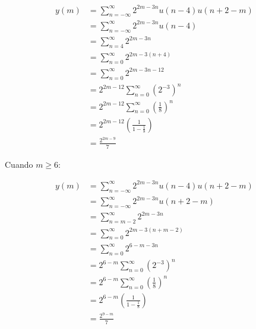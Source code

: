\documentclass[a4paper,12pt,final]{article}
\begin{document}
\begin{enumerate}[label=\alph*)]
          \begin{equation*}
            \begin{split}
              y\left(m\right) & = \sum_{n=-\infty}^{\infty} 2^{2m-3n} u\left(n-4\right) u\left(n+2-m\right) \\
                              & = \sum_{n=-\infty}^{\infty} 2^{2m-3n} u\left(n-4\right) \\
                              & = \sum_{n=4}^{\infty} 2^{2m-3n} \\
                              & = \sum_{n=0}^{\infty} 2^{2m-3\left(n+4\right)} \\
                              & = \sum_{n=0}^{\infty} 2^{2m-3n-12} \\
                              & = 2^{2m-12} \sum_{n=0}^{\infty} \left(2^{-3}\right)^{n} \\
                              & = 2^{2m-12} \sum_{n=0}^{\infty} \left(\frac{1}{8}\right)^{n} \\
                              & = 2^{2m-12} \left(\frac{1}{1-\frac{1}{8}}\right) \\
                              & = \frac{2^{2m-9}}{7}
            \end{split}
          \end{equation*}
          \vfill
          \newpage

          \noindent Cuando $m \geq 6$:

          \begin{equation*}
            \begin{split}
              y\left(m\right) & = \sum_{n=-\infty}^{\infty} 2^{2m-3n} u\left(n-4\right) u\left(n+2-m\right) \\
                              & = \sum_{n=-\infty}^{\infty} 2^{2m-3n} u\left(n+2-m\right) \\
                              & = \sum_{n=m-2}^{\infty} 2^{2m-3n} \\
                              & = \sum_{n=0}^{\infty} 2^{2m-3\left(n+m-2\right)} \\
                              & = \sum_{n=0}^{\infty} 2^{6-m-3n} \\
                              & = 2^{6-m} \sum_{n=0}^{\infty} \left(2^{-3}\right)^{n} \\
                              & = 2^{6-m} \sum_{n=0}^{\infty} \left(\frac{1}{8}\right)^{n} \\
                              & = 2^{6-m} \left(\frac{1}{1-\frac{1}{8}}\right) \\
                              & = \frac{2^{9-m}}{7}
            \end{split}
          \end{equation*}


\end{enumerate}
\end{document}
